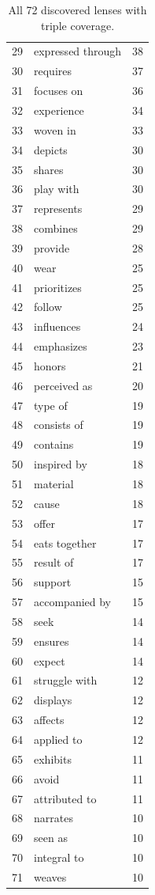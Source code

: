 \documentclass[11pt]{article}
\begin{document}
\begin{table}[h]
\begin{tabular}{clr}
29 & expressed through & 38  \\
30 & requires          & 37  \\
31 & focuses on        & 36  \\
32 & experience        & 34  \\
33 & woven in          & 33  \\
34 & depicts           & 30  \\
35 & shares            & 30  \\
36 & play with         & 30  \\
37 & represents        & 29  \\
38 & combines          & 29  \\
39 & provide           & 28  \\
40 & wear              & 25  \\
41 & prioritizes       & 25  \\
42 & follow            & 25  \\
43 & influences        & 24  \\
44 & emphasizes        & 23  \\
45 & honors            & 21  \\
46 & perceived as      & 20  \\
47 & type of           & 19  \\
48 & consists of       & 19  \\
49 & contains          & 19  \\
50 & inspired by       & 18  \\
51 & material          & 18  \\
52 & cause             & 18  \\
53 & offer             & 17  \\
54 & eats together     & 17  \\
55 & result of         & 17  \\
56 & support           & 15  \\
57 & accompanied by    & 15  \\
58 & seek              & 14  \\
59 & ensures           & 14  \\
60 & expect            & 14  \\
61 & struggle with     & 12  \\
62 & displays          & 12  \\
63 & affects           & 12  \\
64 & applied to        & 12  \\
65 & exhibits          & 11  \\
66 & avoid             & 11  \\
67 & attributed to     & 11  \\
68 & narrates          & 10  \\
69 & seen as           & 10  \\
70 & integral to       & 10  \\
71 & weaves            & 10  \\
\bottomrule
\end{tabular}
\caption{All 72 discovered lenses with triple coverage.}
\label{tab:all_lenses}
\end{table}
\end{document}
